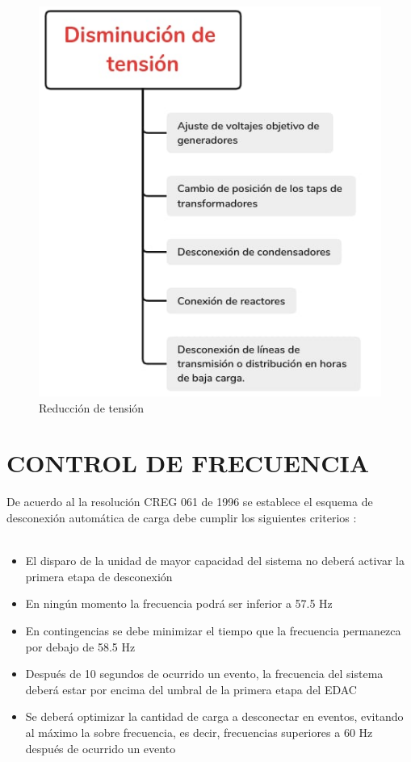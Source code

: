 \documentclass[a5paper]{book}%
\begin{document}
\begin{figure}[H]
  \centering
  \caption{Reducción de  tensión}
  \label{fig:reducciontension}
  \includegraphics[width=0.8\linewidth]{reducirtension}
\end{figure}



\chapter{CONTROL DE FRECUENCIA}

De acuerdo al la resolución CREG 061 de 1996 se establece el esquema de desconexión automática de carga debe cumplir los siguientes criterios \cite{CREG0611996}:\\\\

\begin{itemize}
\item El disparo de la unidad de mayor capacidad del sistema no deberá activar la primera etapa de
desconexión
\item En ningún momento la frecuencia podrá ser inferior a 57.5 Hz
\item En contingencias se debe minimizar el tiempo que la frecuencia permanezca por debajo de 58.5 Hz
\item Después de 10 segundos de ocurrido un evento, la frecuencia del sistema deberá estar por encima
del umbral de la primera etapa del EDAC
\item Se deberá optimizar la cantidad de carga a desconectar en eventos, evitando al máximo la sobre
frecuencia, es decir, frecuencias superiores a 60 Hz después de ocurrido un evento
\end{itemize}
\end{document}
